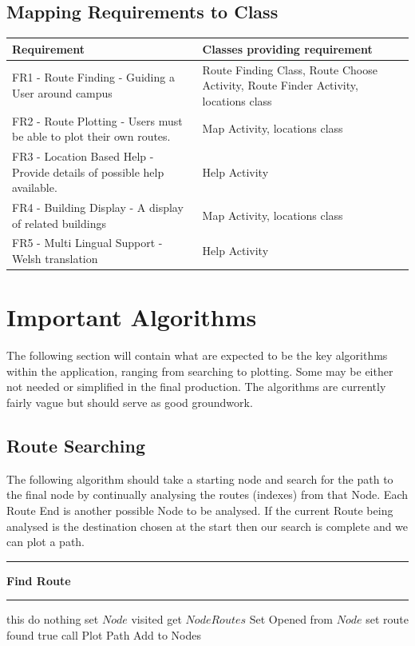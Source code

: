 \documentclass[10pt,a4paper]{article}
\begin{document}
\subsection{Mapping Requirements to Class}
\begin{center}
    \begin{tabular}{ | p{7cm} | p{7cm} |}
    \hline
    Requirement & Classes providing requirement  \\ \hline
    FR1 - Route Finding - Guiding a User around campus & Route Finding Class, Route Choose Activity, Route Finder Activity, locations class  \\ \hline
    FR2 - Route Plotting - Users must be able to plot their own routes.& Map Activity, locations class  \\ \hline
   FR3 - Location Based Help - Provide details of possible help available. & Help Activity  \\ \hline
   FR4 - Building Display - A display of related buildings & Map Activity, locations class \\ \hline
   FR5 - Multi Lingual Support - Welsh translation & Help Activity \\ \hline
    \end{tabular}
\end{center}
\newpage
\section{Important Algorithms}
The following section will contain what are expected to be the key algorithms within the application, ranging from searching to plotting. Some may be either not needed or simplified in the final production. The algorithms are currently fairly vague but should serve as good groundwork. 
\subsection{Route Searching}
The following algorithm should take a starting node and search for the path to the final node by continually analysing the routes (indexes) from that Node. Each Route End is another possible Node to be analysed. If the current Route being analysed is the destination chosen at the start then our search is complete and we can plot a path.  
\vspace{0.3cm}
\hrule
\vspace{0.1cm}
\textbf{Find Route}
\vspace{0.1cm}
\hrule
\vspace{0.1cm}
\begin{algorithmic}[1]
 this
    \State do nothing
\Else
	\State set $Node$ visited
    \State get $Node Routes$
    \State Set Opened from $Node$
    		\State set route found true
    		\State call Plot Path
    	\EndIf
    		\State Add to Nodes
    	\EndIf
    	
    \EndFor
\EndIf
\EndFor
\EndWhile
\end{algorithmic}
\end{document}
